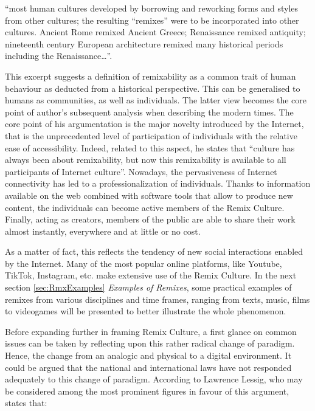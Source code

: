 \begin{displayquote}
    “most human cultures developed by borrowing and reworking forms and styles from other cultures; the resulting “remixes” were to be incorporated into other cultures. Ancient Rome remixed Ancient Greece; Renaissance remixed antiquity; nineteenth century European architecture remixed many historical periods including the Renaissance…”.
\end{displayquote}

This excerpt suggests a definition of remixability as a common trait of human behaviour as deducted from a historical perspective. This can be generalised to humans as communities, as well as individuals. The latter view becomes the core point of author’s subsequent analysis when describing the modern times. The core point of his argumentation is the major novelty introduced by the Internet, that is the unprecedented level of participation of individuals with the relative ease of accessibility. Indeed, related to this aspect, he states that “culture has always been about remixability, but now this remixability is available to all participants of Internet culture”. Nowadays, the pervasiveness of Internet connectivity has led to a professionalization of individuals. Thanks to information available on the web combined with software tools that allow to produce new content, the individuals can become active members of the Remix Culture. Finally, acting as creators, members of the public are able to share their work almost instantly, everywhere and at little or no cost. 

As a matter of fact, this reflects the tendency of new social interactions enabled by the Internet. Many of the most popular online platforms, like Youtube, TikTok, Instagram, etc. make extensive use of the Remix Culture. In the next section \ref{sec:RmxExamples} \emph{Examples of Remixes}, some practical examples of remixes from various disciplines and time frames, ranging from texts, music, films to videogames will be presented to better illustrate the whole phenomenon.

Before expanding further in framing Remix Culture, a first glance on common issues can be taken by reflecting upon this rather radical change of paradigm. Hence, the change from an analogic and physical to a digital environment. It could be argued that the national and international laws have not responded adequately to this change of paradigm. According to Lawrence Lessig, who may be considered among the most prominent figures in favour of this argument, states that: 

